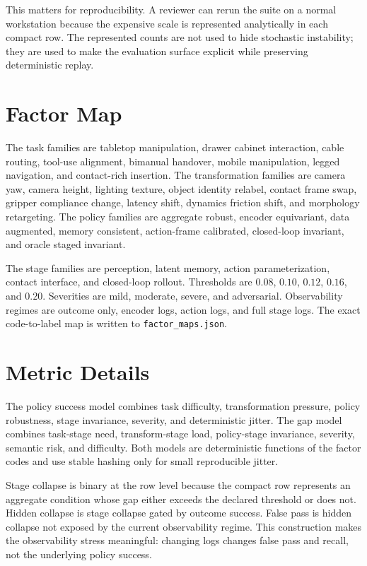 \documentclass{article}
\begin{document}
This matters for reproducibility. A reviewer can rerun the suite on a normal workstation because the expensive scale is represented analytically in each compact row. The represented counts are not used to hide stochastic instability; they are used to make the evaluation surface explicit while preserving deterministic replay.

\section{Factor Map}

The task families are tabletop manipulation, drawer cabinet interaction, cable routing, tool-use alignment, bimanual handover, mobile manipulation, legged navigation, and contact-rich insertion. The transformation families are camera yaw, camera height, lighting texture, object identity relabel, contact frame swap, gripper compliance change, latency shift, dynamics friction shift, and morphology retargeting. The policy families are aggregate robust, encoder equivariant, data augmented, memory consistent, action-frame calibrated, closed-loop invariant, and oracle staged invariant.

The stage families are perception, latent memory, action parameterization, contact interface, and closed-loop rollout. Thresholds are $0.08$, $0.10$, $0.12$, $0.16$, and $0.20$. Severities are mild, moderate, severe, and adversarial. Observability regimes are outcome only, encoder logs, action logs, and full stage logs. The exact code-to-label map is written to \texttt{factor\_maps.json}.

\section{Metric Details}

The policy success model combines task difficulty, transformation pressure, policy robustness, stage invariance, severity, and deterministic jitter. The gap model combines task-stage need, transform-stage load, policy-stage invariance, severity, semantic risk, and difficulty. Both models are deterministic functions of the factor codes and use stable hashing only for small reproducible jitter.

Stage collapse is binary at the row level because the compact row represents an aggregate condition whose gap either exceeds the declared threshold or does not. Hidden collapse is stage collapse gated by outcome success. False pass is hidden collapse not exposed by the current observability regime. This construction makes the observability stress meaningful: changing logs changes false pass and recall, not the underlying policy success.
\end{document}
